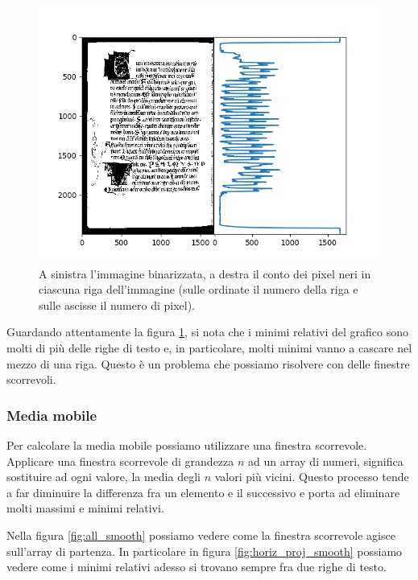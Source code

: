 \begin{figure}
    \includegraphics[width=\textwidth]{figures/horizontal-projection.png}
    \caption{A sinistra l'immagine binarizzata, a destra il conto dei pixel neri in ciascuna riga dell'immagine (sulle ordinate il numero della riga e sulle ascisse il numero di pixel).}
    \label{fig:horiz_proj}
\end{figure}

Guardando attentamente la figura \ref{fig:horiz_proj}, si nota che i minimi relativi del grafico sono molti di pi\`u delle righe di testo e, in particolare, molti minimi vanno a cascare nel mezzo di una riga. Questo \`e un problema che possiamo risolvere con delle finestre scorrevoli.

\subsubsection{Media mobile}

Per calcolare la media mobile possiamo utilizzare una finestra scorrevole. Applicare una finestra scorrevole di grandezza $n$ ad un array di numeri, significa sostituire ad ogni valore, la media degli $n$ valori pi\`u vicini. Questo processo tende a far diminuire la differenza fra un elemento e il successivo e porta ad eliminare molti massimi e minimi relativi.

Nella figura \ref{fig:all_smooth} possiamo vedere come la finestra scorrevole agisce sull'array di partenza. In particolare in figura \ref{fig:horiz_proj_smooth} possiamo vedere come i minimi relativi adesso si trovano sempre fra due righe di testo.

